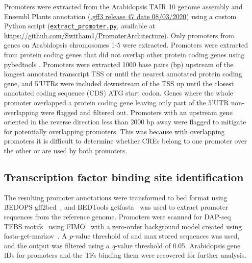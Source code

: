 \documentclass[../main.tex]{subfiles}
\begin{document}
Promoters were extracted from the Arabidopsis TAIR 10 \autocite{lameschArabidopsisInformationResource2012} genome assembly and Ensembl Plants \autocite{howeEnsemblGenomes20202020} annotation (\href{ftp://ftp.ensemblgenomes.org/pub/release-47/plants/gff3/arabidopsis_thaliana/}{.gff3 release 47 date 08/03/2020}) using a custom Python script (\href{https://github.com/Switham1/PromoterArchitecture/blob/master/src/data_sorting/extract_promoter.py}{\texttt{extract\_promoter.py}}, available at \url{https://github.com/Switham1/PromoterArchitecture}).
Only promoters from genes on Arabidopsis chromosomes 1-5 were extracted.
Promoters were extracted from protein coding genes that did not overlap other protein coding genes using pybedtools \autocite{dalePybedtoolsFlexiblePython2011}.
Promoters were extracted 1000 base pairs (bp) upstream of the longest annotated transcript TSS or until the nearest annotated protein coding gene, and 5'UTRs were included downstream of the TSS up until the closest annotated coding sequence (CDS) ATG start codon.
Genes where the whole promoter overlapped a protein coding gene leaving only part of the 5'UTR non-overlapping were flagged and filtered out.
Promoters with an upstream gene oriented in the reverse direction less than 2000 bp away were flagged to mitigate for potentially overlapping promoters.
This was because with overlapping promoters it is difficult to determine whether CREs belong to one promoter over the other or are used by both promoters.

\subsection{Transcription factor binding site identification}
\label{chapter1:methods:transcription-factor-binding-site-identification}

The resulting promoter annotations were transformed to bed format using BEDOPS gff2bed~\autocite{nephBEDOPSHighperformanceGenomic2012}, and BEDTools getfasta~\autocite{quinlanBEDToolsFlexibleSuite2010} was used to extract promoter sequences from the reference genome.
Promoters were scanned for DAP\hyp{}seq TFBS motifs~\autocite{omalleyCistromeEpicistromeFeatures2016} using FIMO~\autocite{grantFIMOScanningOccurrences2011} with a zero\hyp{}order background model created using fasta\hyp{}get\hyp{}markov~\autocite{baileyMEMESuiteTools2009}.
A \textit{p}\hyp{}value threshold of  and max stored sequences  was used, and the output was filtered using a \textit{q}\hyp{}value threshold of 0.05.
Arabidopsis gene IDs for promoters and the TFs binding them were recovered for further analysis.
\end{document}
